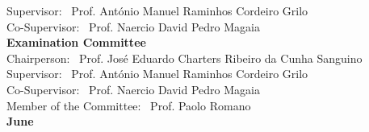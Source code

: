 \begin{titlepage}
\begin{center}
{\large Supervisor: \ Prof. António Manuel Raminhos Cordeiro Grilo}\\
{\large Co-Supervisor: \ Prof. Naercio David Pedro Magaia}\\[2cm]
{\Large \textbf{Examination Committee}}\\[1cm]
{\large Chairperson: \ Prof. José Eduardo Charters Ribeiro da Cunha Sanguino}\\
{\large Supervisor: \ Prof. António Manuel Raminhos Cordeiro Grilo}\\
{\large Co-Supervisor: \ Prof. Naercio David Pedro Magaia}\\
{\large Member of the Committee: \ Prof. Paolo Romano}\\[2cm]


{\Large \textbf{June}}\\
\end{center}
\end{titlepage}